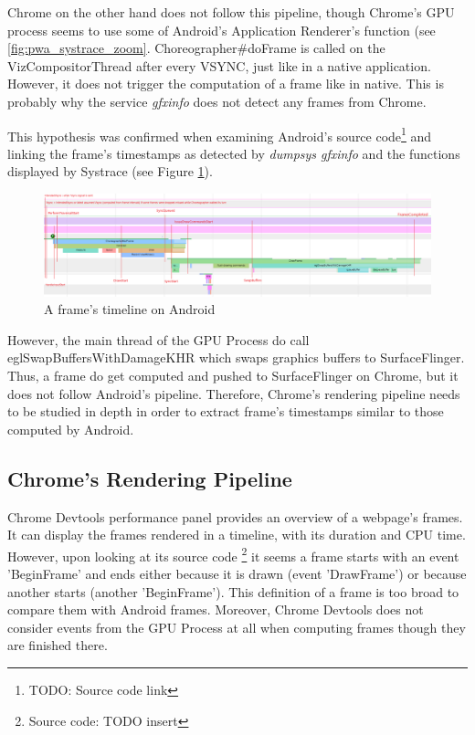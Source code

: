 \documentclass{kththesis}
\begin{document}
    Chrome on the other hand does not follow this pipeline, though Chrome's GPU process seems to use some of Android's Application Renderer's function (see \ref{fig:pwa_systrace_zoom}. Choreographer\#doFrame is called on the VizCompositorThread after every VSYNC, just like in a native application. However, it does not trigger the computation of a frame like in native. This is probably why the service \textit{gfxinfo} does not detect any frames from Chrome. 
    
    This hypothesis was confirmed when examining Android's source code\footnote{TODO: Source code link} and linking the frame's timestamps as detected by \textit{dumpsys gfxinfo} and the functions displayed by Systrace (see Figure \ref{fig:android_frame_timeline}).
    
    \begin{figure}[!ht]
        \centering
        \includegraphics[width=13cm]{kththesis/Figures/Android_frame_timeline.png}
        \caption{A frame's timeline on Android}
        \label{fig:android_frame_timeline}
    \end{figure}
    
    However, the main thread of the GPU Process do call eglSwapBuffersWithDamageKHR which swaps graphics buffers to SurfaceFlinger. Thus, a frame do get computed and pushed to SurfaceFlinger on Chrome, but it does not follow Android's pipeline. Therefore, Chrome's rendering pipeline needs to be studied in depth in order to extract frame's timestamps similar to those computed by Android. 
    
    
    \subsection{Chrome's Rendering Pipeline}
    
 Chrome Devtools performance panel provides an overview of a webpage's frames. It can display the frames rendered in a timeline, with its duration and CPU time. However, upon looking at its source code \footnote{Source code: TODO insert} it seems a frame starts with an event 'BeginFrame' and ends either because it is drawn (event 'DrawFrame') or because another starts (another 'BeginFrame'). This definition of a frame is too broad to compare them with Android frames. Moreover, Chrome Devtools does not consider events from the GPU Process at all when computing frames though they are finished there.
\end{document}
